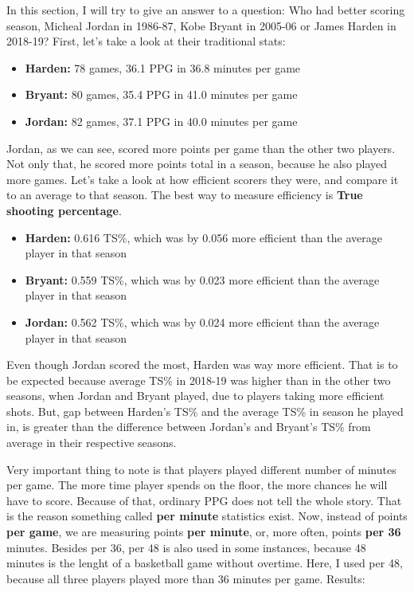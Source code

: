 \documentclass[a4paper]{article}
\begin{document}
In this section, I will try to give an answer to a question: Who had better scoring season, Micheal Jordan in 1986-87, Kobe Bryant in 2005-06 or James Harden in 2018-19? First, let's take a look at their traditional stats:

\begin{itemize}
	\item \textbf{Harden:} 78 games, 36.1 PPG in 36.8 minutes per game
	\item \textbf{Bryant:} 80 games, 35.4 PPG in 41.0 minutes per game
	\item \textbf{Jordan:} 82 games, 37.1 PPG in 40.0 minutes per game
\end{itemize}

Jordan, as we can see, scored more points per game than the other two players. Not only that, he scored more points total in a season, because he also played more games. Let's take a look at how efficient scorers they were, and compare it to an average to that season. The best way to measure efficiency is \textbf{True shooting percentage}.

\begin{itemize}
	\item \textbf{Harden:} 0.616 TS\%, which was by 0.056 more efficient than the average player in that season
	\item \textbf{Bryant:} 0.559 TS\%, which was by 0.023 more efficient than the average player in that season
	\item \textbf{Jordan:} 0.562 TS\%, which was by 0.024 more efficient than the average player in that season
\end{itemize}

Even though Jordan scored the most, Harden was way more efficient. That is to be expected because average TS\% in 2018-19 was higher than in the other two seasons, when Jordan and Bryant played, due to players taking more efficient shots. But, gap between Harden's TS\% and the average TS\% in season he played in, is greater than the difference between Jordan's and Bryant's TS\% from average in their respective seasons.

Very important thing to note is that players played different number of minutes per game. The more time player spends on the floor, the more chances he will have to score. Because of that, ordinary PPG does not tell the whole story. That is the reason something called \textbf{per minute} statistics exist. Now, instead of points \textbf{per game}, we are measuring points \textbf{per minute}, or, more often, points \textbf{per 36} minutes. Besides per 36, per 48 is also used in some instances, because 48 minutes is the lenght of a basketball game without overtime. Here, I used per 48, because all three players played more than 36 minutes per game. Results:
\end{document}
